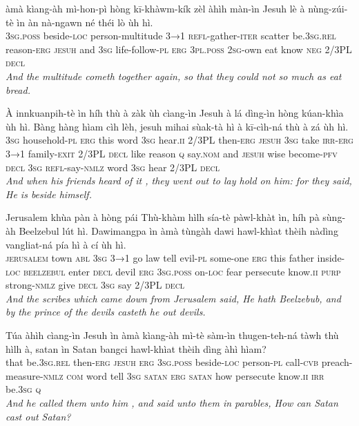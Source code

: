 \documentclass[11pt,a4paper]{article}
\begin{document}
\begin{exe}
\gll àmà kìang-àh mì-hon-pì hòng kī-khàwm-kík zèl àhìh màn-ìn Jesuh lè à nùng-zúi-tè ìn àn nà-ngawn né théi lò ùh hì. \\
     \textsc{3sg}.\textsc{poss} beside-\textsc{loc} person-multitude \textsc{3→1} \textsc{refl}-gather-\textsc{iter} scatter be.\textsc{3sg}.\textsc{rel} reason-\textsc{erg} \textsc{jesuh} and \textsc{3sg} life-follow-\textsc{pl} \textsc{erg} \textsc{3pl}.\textsc{poss} \textsc{2sg}-own eat know \textsc{neg} 2/3PL \textsc{decl} \\
\glt \textcolor{kjvcolor}{\textit{And the multitude cometh together again, so that they could not so much as eat bread.}}

\gll À innkuanpih-tè ìn híh thù à zàk ùh cìang-ìn Jesuh à lá dìng-ìn hòng kúan-khìa ùh hì. Bàng hàng hìam cìh lèh, jesuh mihai sùak-tà hì à kī-cìh-ná thù à zá ùh hì. \\
     \textsc{3sg} household-\textsc{pl} \textsc{erg} this word \textsc{3sg} hear.\textsc{ii} 2/3PL then-\textsc{erg} \textsc{jesuh} \textsc{3sg} take \textsc{irr}-\textsc{erg} \textsc{3→1} family-\textsc{exit} 2/3PL \textsc{decl} like reason \textsc{q} say.\textsc{nom} and \textsc{jesuh} wise become-\textsc{pfv} \textsc{decl} \textsc{3sg} \textsc{refl}-say-\textsc{nmlz} word \textsc{3sg} hear 2/3PL \textsc{decl} \\
\glt \textcolor{kjvcolor}{\textit{And when his friends heard of it , they went out to lay hold on him: for they said, He is beside himself.}}

\gll Jerusalem khùa pàn à hòng pái Thù-khàm hìlh sía-tè pàwl-khàt ìn, híh pà sùng-àh Beelzebul lút hì. Dawimangpa ìn àmà tùngàh dawi hawl-khìat thèih nàdìng vangliat-ná pía hì à cí ùh hì. \\
     \textsc{jerusalem} town \textsc{abl} \textsc{3sg} \textsc{3→1} go law tell evil-\textsc{pl} some-one \textsc{erg} this father inside-\textsc{loc} \textsc{beelzebul} enter \textsc{decl} devil \textsc{erg} \textsc{3sg}.\textsc{poss} on-\textsc{loc} fear persecute know.\textsc{ii} \textsc{purp} strong-\textsc{nmlz} give \textsc{decl} \textsc{3sg} say 2/3PL \textsc{decl} \\
\glt \textcolor{kjvcolor}{\textit{And the scribes which came down from Jerusalem said, He hath Beelzebub, and by the prince of the devils casteth he out devils.}}

\gll Túa àhìh cìang-ìn Jesuh ìn àmà kìang-àh mì-tè sàm-ìn thugen-teh-ná tàwh thù hìlh à, satan ìn Satan bangci hawl-khìat thèih dìng àhì hìam? \\
     that be.\textsc{3sg}.\textsc{rel} then-\textsc{erg} \textsc{jesuh} \textsc{erg} \textsc{3sg}.\textsc{poss} beside-\textsc{loc} person-\textsc{pl} call-\textsc{cvb} preach-measure-\textsc{nmlz} \textsc{com} word tell \textsc{3sg} \textsc{satan} \textsc{erg} \textsc{satan} how persecute know.\textsc{ii} \textsc{irr} be.\textsc{3sg} \textsc{q} \\
\glt \textcolor{kjvcolor}{\textit{And he called them unto him , and said unto them in parables, How can Satan cast out Satan?}}


\end{exe}
\end{document}

